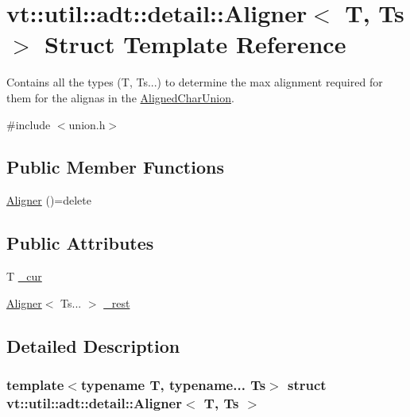 \hypertarget{structvt_1_1util_1_1adt_1_1detail_1_1_aligner}{}\section{vt\+:\+:util\+:\+:adt\+:\+:detail\+:\+:Aligner$<$ T, Ts $>$ Struct Template Reference}
\label{structvt_1_1util_1_1adt_1_1detail_1_1_aligner}


Contains all the types (T, Ts...) to determine the max alignment required for them for the alignas in the {\ttfamily \hyperlink{structvt_1_1util_1_1adt_1_1_aligned_char_union}{Aligned\+Char\+Union}}.  




{\ttfamily \#include $<$union.\+h$>$}

\subsection*{Public Member Functions}
\begin{DoxyCompactItemize}
\item 
\hyperlink{structvt_1_1util_1_1adt_1_1detail_1_1_aligner_a998732c9b376b2a0020425ba72d5d5ae}{Aligner} ()=delete
\end{DoxyCompactItemize}
\subsection*{Public Attributes}
\begin{DoxyCompactItemize}
\item 
T \hyperlink{structvt_1_1util_1_1adt_1_1detail_1_1_aligner_aafdf38bb15e0136c6c529108f28c2dee}{\+\_\+cur}
\item 
\hyperlink{structvt_1_1util_1_1adt_1_1detail_1_1_aligner}{Aligner}$<$ Ts... $>$ \hyperlink{structvt_1_1util_1_1adt_1_1detail_1_1_aligner_a4115223efc04e8781590dea362fc36f0}{\+\_\+rest}
\end{DoxyCompactItemize}


\subsection{Detailed Description}
\subsubsection*{template$<$typename T, typename... Ts$>$\newline
struct vt\+::util\+::adt\+::detail\+::\+Aligner$<$ T, Ts $>$}

